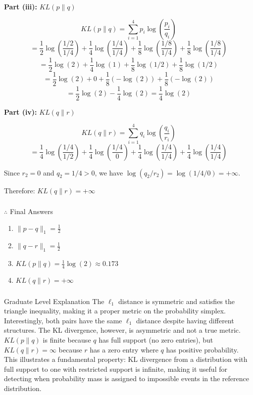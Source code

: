 \documentclass{article}
\begin{document}
{\textbf{Part (iii):} $KL(p \| q)$

$$KL(p \| q) = \sum_{i=1}^{4} p_i \log\left(\frac{p_i}{q_i}\right)$$
$$= \frac{1}{2}\log\left(\frac{1/2}{1/4}\right) + \frac{1}{4}\log\left(\frac{1/4}{1/4}\right) + \frac{1}{8}\log\left(\frac{1/8}{1/4}\right) + \frac{1}{8}\log\left(\frac{1/8}{1/4}\right)$$
$$= \frac{1}{2}\log(2) + \frac{1}{4}\log(1) + \frac{1}{8}\log(1/2) + \frac{1}{8}\log(1/2)$$
$$= \frac{1}{2}\log(2) + 0 + \frac{1}{8}(-\log(2)) + \frac{1}{8}(-\log(2))$$
$$= \frac{1}{2}\log(2) - \frac{1}{4}\log(2) = \frac{1}{4}\log(2)$$

\textbf{Part (iv):} $KL(q \| r)$

$$KL(q \| r) = \sum_{i=1}^{4} q_i \log\left(\frac{q_i}{r_i}\right)$$
$$= \frac{1}{4}\log\left(\frac{1/4}{1/2}\right) + \frac{1}{4}\log\left(\frac{1/4}{0}\right) + \frac{1}{4}\log\left(\frac{1/4}{1/4}\right) + \frac{1}{4}\log\left(\frac{1/4}{1/4}\right)$$

Since $r_2 = 0$ and $q_2 = 1/4 > 0$, we have $\log(q_2/r_2) = \log(1/4/0) = +\infty$.

Therefore: $KL(q \| r) = +\infty$
}

\subsubsection*{\normalfont}{$\therefore$ Final Answers}
\begin{enumerate}
\item $\|p - q\|_1 = \frac{1}{2}$
\item $\|q - r\|_1 = \frac{1}{2}$
\item $KL(p \| q) = \frac{1}{4}\log(2) \approx 0.173$
\item $KL(q \| r) = +\infty$
\end{enumerate}

\subsubsection*{\normalfont}{Graduate Level Explanation}
The $\ell_1$ distance is symmetric and satisfies the triangle inequality, making it a proper metric on the probability simplex. Interestingly, both pairs have the same $\ell_1$ distance despite having different structures. The KL divergence, however, is asymmetric and not a true metric. $KL(p \| q)$ is finite because $q$ has full support (no zero entries), but $KL(q \| r) = \infty$ because $r$ has a zero entry where $q$ has positive probability. This illustrates a fundamental property: KL divergence from a distribution with full support to one with restricted support is infinite, making it useful for detecting when probability mass is assigned to impossible events in the reference distribution.
\end{document}
